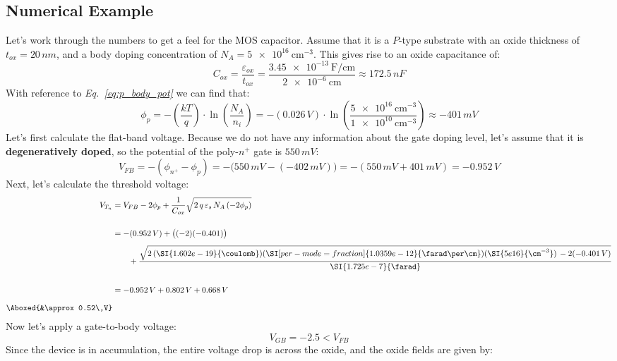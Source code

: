 \subsection{Numerical Example}
Let's work through the numbers to get a feel for the MOS capacitor.  Assume that it is a $P$-type substrate with an oxide thickness of $t_{ox} = 20\,nm$, and a body doping concentration of $N_A = \SI{5e16}{\cm^{-3}}$.
This gives rise to an oxide capacitance of:
    \begin{equation*}
        C_{ox} = \frac{\varepsilon_{ox}}{t_{ox}}
        = \frac{\SI[per-mode = fraction]{3.45e-13}{\farad\per\cm}}{\SI{2e-6}{\cm}}
        \approx \boxed{ 172.5\,nF }
    \end{equation*}
With reference to \emph{Eq.~\ref{eq:p_body_pot}} we can find that:
    \begin{equation*}
        \phi_p = -\left( \frac{kT}{q} \right) \cdot \ln \left( \frac{N_A}{n_i} \right)
        = -(0.026\,V)\cdot \ln \left( \frac{\SI{5e16}{\cm^{-3}}}{\SI{1e10}{\cm^{-3}}} \right)
        \approx \boxed{ -401\,mV }
    \end{equation*}
Let's first calculate the flat-band voltage.  Because we do not have any information about the gate doping level, let's assume that it is \textbf{degeneratively doped}, so the potential of the poly-$n^+$ gate is $550\,mV$:
    \begin{equation*}
        V_{FB} = -(\phi_{n^+} - \phi_p) = -\big(550\,mV -(-402\,mV)\big) = -(550\,mV + 401\,mV) = \boxed{ -0.952\,V }
    \end{equation*}
Next, let's calculate the threshold voltage:
    \begin{align*}
        V_{T_n} &= V_{FB} - 2\phi_p + \frac{1}{C_{ox}} \sqrt{ 2\,q\,\varepsilon_s\,N_A\,(-2\phi_p) }\\[0.5cm]
        &= -(0.952\,V) + \big((-2)(-0.401)\big) \\[0.15cm]
        &\qquad + \frac{\sqrt{ 2\,(\SI{1.602e-19}{\coulomb})(\SI[per-mode = fraction]{1.0359e-12}{\farad\per\cm})(\SI{5e16}{\cm^{-3}})\,-2(-0.401\,V) }} {\SI{1.725e-7}{\farad}}\\[0.5cm]
        &= -0.952\,V + 0.802\,V + 0.668\,V\\[0.25cm]
        \Aboxed{&\approx0.52\,V}
    \end{align*}
Now let's apply a gate-to-body voltage:
    \begin{equation*}
        V_{GB} = -2.5 < V_{FB}
    \end{equation*}
Since the device is in accumulation, the entire voltage drop is across the oxide, and the oxide fields are given by:
